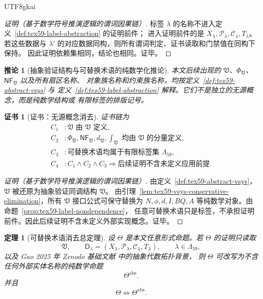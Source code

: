 \documentclass[12pt]{article}
\newtheorem{theorem}{定理}[section]
\newtheorem{corollary}{推论}[section]
\newtheorem{Certificate}{证书}[section]
\newcommand{\Vsys}{\mathfrak V}
\newcommand{\NF}{\mathsf{NF}}
\begin{document}
\begin{CJK*}{UTF8}{gkai}
\begin{proof}[证明（基于数学符号推演逻辑的谓词因果链）]
标签 \(\lambda\) 的名称不进入定义~\ref{def:tex59-label-abstraction} 的证明前件；
进入证明前件的是 \(X_\lambda,\mathcal P_\lambda,\mathcal C_\lambda,T_\lambda\)。
若这些数据与 \(\lambda'\) 的对应数据同构，则所有谓词判定、证书读取和门禁值在同构下保持。
因此证明依赖集相同，结论也相同。证毕。
\end{proof}

\begin{corollary}[抽象验证结构与可替换术语的纯数学化推论]
\label{cor:tex59-vsys-pure-math}
本文后续出现的 \(\Vsys\)、\(\Phi_{\Vsys}\)、\(\NF_{\Vsys}\) 以及所有扇区名称、
对象族名称和约束族名称，均按定义~\ref{def:tex59-abstract-vsys} 与
定义~\ref{def:tex59-label-abstraction} 解释。它们不是独立的无源概念，而是纯数学结构或
有限标签的排版记号。
\end{corollary}

\begin{Certificate}[证书：无源概念消去]
\label{cert:tex59-vsys-pure-math}
证书链为
\[
\begin{aligned}
  C_1 &: \Vsys\text{ 由 }\mathfrak V\text{ 定义},\\
  C_2 &: \Phi_{\Vsys},\NF_{\Vsys},d_{\Vsys},\int_{\Vsys}
         \text{ 均由 }\mathfrak V\text{ 的分量定义},\\
  C_3 &: \text{可替换术语均属于有限标签集 }\Lambda_{59},\\
  C_4 &: C_1\wedge C_2\wedge C_3
         \Rightarrow
         \text{后续证明不含未定义应用前提}.
\end{aligned}
\]
\end{Certificate}

\begin{proof}[证明（基于数学符号推演逻辑的谓词因果链）]
由定义~\ref{def:tex59-abstract-vsys}，\(\Vsys\) 被还原为抽象验证同调结构 \(\mathfrak V\)。
由引理~\ref{lem:tex59-vsys-conservative-elimination}，所有 \(\Vsys\) 接口公式可保守替换为
\(N,\phi,d,I,BQ,A\) 等纯数学对象。由命题~\ref{prop:tex59-label-nondependence}，
任意可替换术语只是标签，不承担证明前件。因此后续证明不含未定义外部实现概念。证毕。
\end{proof}

\begin{theorem}[可替换术语消去总定理]
\label{thm:tex59-terminology-elimination-total}
设 \(\Theta\) 是本文任意形式命题。若 \(\Theta\) 的证明只读取
\[
  \mathfrak V,\qquad
  \mathsf D_{\lambda}
  =
  (X_\lambda,\mathcal P_\lambda,\mathcal C_\lambda,T_\lambda),
  \qquad
  \lambda\in\Lambda_{59},
\]
以及 Gao 2025 年 Zenodo 基础文献 \cite{Gao2025PureMathZenodo} 中的抽象代数拓扑背景，
则 \(\Theta\) 可改写为不含任何外部实体名称的纯数学命题
\[
  \Theta^{\mathrm{abs}}.
\]
并且
\[
  \Theta\Longleftrightarrow \Theta^{\mathrm{abs}}.
\]
\end{theorem}


\end{CJK*}
\end{document}
